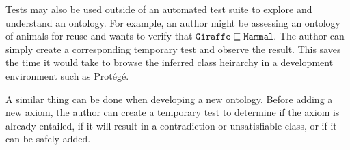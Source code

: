 \documentclass[paper.tex]{subfiles}
\begin{document}
Tests may also be used outside of an automated test suite to explore and understand an ontology.
For example, an author might be assessing an ontology of animals for reuse and wants to verify that $\mathtt{Giraffe} \sqsubseteq \mathtt{Mammal}$.
The author can simply create a corresponding temporary test and observe the result.
This saves the time it would take to browse the inferred class heirarchy in a development environment such as Prot\'eg\'e.

A similar thing can be done when developing a new ontology.
Before adding a new axiom, the author can create a temporary test to determine if the axiom is already entailed, if it will result in a contradiction or unsatisfiable class, or if it can be safely added.
\end{document}
